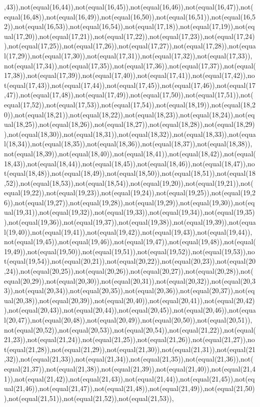 ,43)),not(equal(16,44)),not(equal(16,45)),not(equal(16,46)),not(equal(16,47)),not(equal(16,48)),not(equal(16,49)),not(equal(16,50)),not(equal(16,51)),not(equal(16,52)),not(equal(16,53)),not(equal(16,54)),not(equal(17,18)),not(equal(17,19)),not(equal(17,20)),not(equal(17,21)),not(equal(17,22)),not(equal(17,23)),not(equal(17,24)),not(equal(17,25)),not(equal(17,26)),not(equal(17,27)),not(equal(17,28)),not(equal(17,29)),not(equal(17,30)),not(equal(17,31)),not(equal(17,32)),not(equal(17,33)),not(equal(17,34)),not(equal(17,35)),not(equal(17,36)),not(equal(17,37)),not(equal(17,38)),not(equal(17,39)),not(equal(17,40)),not(equal(17,41)),not(equal(17,42)),not(equal(17,43)),not(equal(17,44)),not(equal(17,45)),not(equal(17,46)),not(equal(17,47)),not(equal(17,48)),not(equal(17,49)),not(equal(17,50)),not(equal(17,51)),not(equal(17,52)),not(equal(17,53)),not(equal(17,54)),not(equal(18,19)),not(equal(18,20)),not(equal(18,21)),not(equal(18,22)),not(equal(18,23)),not(equal(18,24)),not(equal(18,25)),not(equal(18,26)),not(equal(18,27)),not(equal(18,28)),not(equal(18,29)),not(equal(18,30)),not(equal(18,31)),not(equal(18,32)),not(equal(18,33)),not(equal(18,34)),not(equal(18,35)),not(equal(18,36)),not(equal(18,37)),not(equal(18,38)),not(equal(18,39)),not(equal(18,40)),not(equal(18,41)),not(equal(18,42)),not(equal(18,43)),not(equal(18,44)),not(equal(18,45)),not(equal(18,46)),not(equal(18,47)),not(equal(18,48)),not(equal(18,49)),not(equal(18,50)),not(equal(18,51)),not(equal(18,52)),not(equal(18,53)),not(equal(18,54)),not(equal(19,20)),not(equal(19,21)),not(equal(19,22)),not(equal(19,23)),not(equal(19,24)),not(equal(19,25)),not(equal(19,26)),not(equal(19,27)),not(equal(19,28)),not(equal(19,29)),not(equal(19,30)),not(equal(19,31)),not(equal(19,32)),not(equal(19,33)),not(equal(19,34)),not(equal(19,35)),not(equal(19,36)),not(equal(19,37)),not(equal(19,38)),not(equal(19,39)),not(equal(19,40)),not(equal(19,41)),not(equal(19,42)),not(equal(19,43)),not(equal(19,44)),not(equal(19,45)),not(equal(19,46)),not(equal(19,47)),not(equal(19,48)),not(equal(19,49)),not(equal(19,50)),not(equal(19,51)),not(equal(19,52)),not(equal(19,53)),not(equal(19,54)),not(equal(20,21)),not(equal(20,22)),not(equal(20,23)),not(equal(20,24)),not(equal(20,25)),not(equal(20,26)),not(equal(20,27)),not(equal(20,28)),not(equal(20,29)),not(equal(20,30)),not(equal(20,31)),not(equal(20,32)),not(equal(20,33)),not(equal(20,34)),not(equal(20,35)),not(equal(20,36)),not(equal(20,37)),not(equal(20,38)),not(equal(20,39)),not(equal(20,40)),not(equal(20,41)),not(equal(20,42)),not(equal(20,43)),not(equal(20,44)),not(equal(20,45)),not(equal(20,46)),not(equal(20,47)),not(equal(20,48)),not(equal(20,49)),not(equal(20,50)),not(equal(20,51)),not(equal(20,52)),not(equal(20,53)),not(equal(20,54)),not(equal(21,22)),not(equal(21,23)),not(equal(21,24)),not(equal(21,25)),not(equal(21,26)),not(equal(21,27)),not(equal(21,28)),not(equal(21,29)),not(equal(21,30)),not(equal(21,31)),not(equal(21,32)),not(equal(21,33)),not(equal(21,34)),not(equal(21,35)),not(equal(21,36)),not(equal(21,37)),not(equal(21,38)),not(equal(21,39)),not(equal(21,40)),not(equal(21,41)),not(equal(21,42)),not(equal(21,43)),not(equal(21,44)),not(equal(21,45)),not(equal(21,46)),not(equal(21,47)),not(equal(21,48)),not(equal(21,49)),not(equal(21,50)),not(equal(21,51)),not(equal(21,52)),not(equal(21,53)),